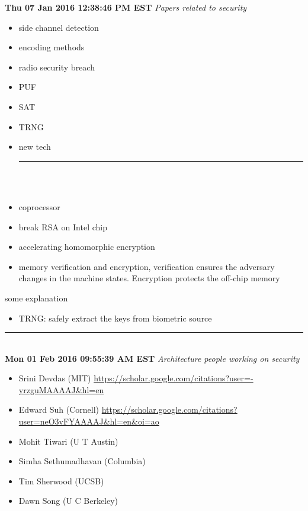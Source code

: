 \documentclass[]{article}
\begin{document}
\noindent \textbf{Thu 07 Jan 2016 12:38:46 PM EST}
\textit{Papers related to security}
\begin{itemize}
	\item side channel detection \cite{longo2015soc} 
	\item encoding methods \cite{chakraborti2015trivia} 
	\item radio security breach \cite{genkin2015stealing}
	\item PUF \cite{aysu2015end} \cite{maes2015secure} \cite{herder2014physical} \cite{devadas2010secure}
	\item SAT \cite{saha2015improved}
	\item TRNG \cite{haddad2015physical}\cite{suh2007physical}\cite{herder2014trapdoor}
	\item new tech \cite{suh2003efficient}
	
\rule[-0.1cm]{7.5in}{0.01cm}\\
\\
	\item coprocessor \cite{roy2015lightweight} 
	\item break RSA on Intel chip \cite{bhattacharya2015watches}
	\item accelerating homomorphic encryption \cite{doroz2015accelerating}
	\item memory verification and encryption, verification ensures the
adversary changes in the machine states. Encryption protects the off-chip
memory\cite{suh2003efficient}

\end{itemize}

some explanation
\begin{itemize}
	\item \cite{herder2014trapdoor}TRNG: safely extract the keys from biometric source
\end{itemize}

\rule[-0.1cm]{7.5in}{0.01cm}\\
\noindent \textbf{Mon 01 Feb 2016 09:55:39 AM EST}
\textit{Architecture people working on security}

\begin{itemize}
	\item Srini Devdas (MIT) \url{https://scholar.google.com/citations?user=-yrzguMAAAAJ&hl=en}
	\item Edward Suh (Cornell) \url{https://scholar.google.com/citations?user=neO3vFYAAAAJ&hl=en&oi=ao}~\cite{chen2015execution}
	\item Mohit Tiwari (U T Austin)
	\item Simha Sethumadhavan (Columbia)
	\item Tim Sherwood (UCSB)
	\item Dawn Song (U C Berkeley)
\end{itemize}
\end{document}
